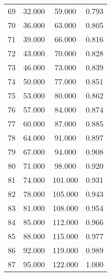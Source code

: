 \begin{tabular}{cccc}
  69 & 32.000 & 59.000 & 0.793 \\ 
  70 & 36.000 & 63.000 & 0.805 \\ 
  71 & 39.000 & 66.000 & 0.816 \\ 
  72 & 43.000 & 70.000 & 0.828 \\ 
  73 & 46.000 & 73.000 & 0.839 \\ 
  74 & 50.000 & 77.000 & 0.851 \\ 
  75 & 53.000 & 80.000 & 0.862 \\ 
  76 & 57.000 & 84.000 & 0.874 \\ 
  77 & 60.000 & 87.000 & 0.885 \\ 
  78 & 64.000 & 91.000 & 0.897 \\ 
  79 & 67.000 & 94.000 & 0.908 \\ 
  80 & 71.000 & 98.000 & 0.920 \\ 
  81 & 74.000 & 101.000 & 0.931 \\ 
  82 & 78.000 & 105.000 & 0.943 \\ 
  83 & 81.000 & 108.000 & 0.954 \\ 
  84 & 85.000 & 112.000 & 0.966 \\ 
  85 & 88.000 & 115.000 & 0.977 \\ 
  86 & 92.000 & 119.000 & 0.989 \\ 
  87 & 95.000 & 122.000 & 1.000 \\ 
   \hline
\end{tabular}
